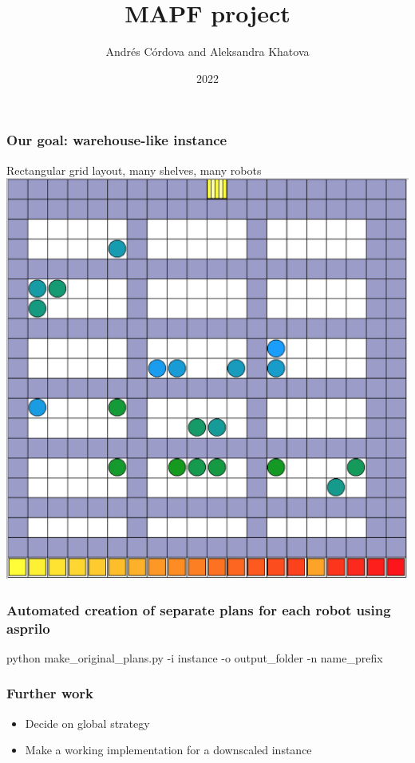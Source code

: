 \documentclass{beamer}
\title{MAPF project}
\author{Andrés Córdova and Aleksandra Khatova}
\institute{Unversity of Potsdam}
\date{2022}
\begin{document}
\frame{\titlepage}

\begin{frame}
\frametitle{Our goal: warehouse-like instance}
Rectangular grid layout, many shelves, many robots
\centering
\includegraphics[scale=0.3]{med_dense.png}
\end{frame}

\begin{frame}
\frametitle{Automated creation of separate plans for each robot using asprilo}
python make\_original\_plans.py -i instance -o output\_folder -n name\_prefix
\end{frame}


\begin{frame}
\frametitle{Further work}
\begin{itemize} 
\item<1-> Decide on global strategy
\item<2-> Make a working implementation for a downscaled instance
\end{itemize} 
\end{frame}
\end{document}

